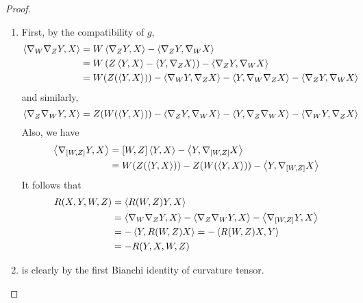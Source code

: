 \begin{enumerate}[label=\arabic{*}.]
\begin{proof}
\begin{enumerate}[label=(\arabic{*})]
			\item First, by the compatibility of $g$,
			\begin{equation*}
				\begin{aligned}
					\left\langle \nabla_W\nabla_ZY,X \right\rangle &= W \left\langle \nabla_ZY,X \right\rangle - \left\langle \nabla_ZY,\nabla_W X \right\rangle\\
					&= W \left(Z\left\langle Y,X \right\rangle - \left\langle Y,\nabla_ZX \right\rangle\right)- \left\langle \nabla_ZY,\nabla_W X \right\rangle\\
					&=W(Z(\left\langle Y,X \right\rangle)) - \left\langle \nabla_WY,\nabla_ZX \right\rangle- \left\langle Y,\nabla_W\nabla_ZX \right\rangle- \left\langle \nabla_ZY,\nabla_W X \right\rangle
				\end{aligned}
			\end{equation*}
			and similarly,
			\begin{equation*}
				\left\langle \nabla_Z\nabla_WY,X \right\rangle = Z(W(\left\langle Y,X \right\rangle)) - \left\langle \nabla_ZY,\nabla_WX \right\rangle- \left\langle Y,\nabla_Z\nabla_WX \right\rangle- \left\langle \nabla_WY,\nabla_Z X \right\rangle
			\end{equation*}
			Also, we have
			\begin{equation*}
				\begin{aligned}
					\left\langle \nabla_{[W,Z]}Y,X \right\rangle&= [W,Z]\left\langle Y,X \right\rangle - \left\langle Y,\nabla_{[W,Z]}X \right\rangle \\
					&=W(Z(\left\langle Y,X \right\rangle)) - Z(W(\left\langle Y,X \right\rangle))- \left\langle Y,\nabla_{[W,Z]}X \right\rangle
				\end{aligned}
			\end{equation*}
			It follows that
			\begin{equation*}
				\begin{aligned}
					R(X,Y,W,Z) &= \left\langle R(W,Z)Y,X \right\rangle \\
					&= \left\langle \nabla_W\nabla_ZY,X \right\rangle - \left\langle \nabla_Z\nabla_WY,X \right\rangle - \left\langle \nabla_{[W,Z]}Y,X \right\rangle \\
					&= -\left\langle Y,R(W,Z)X \right\rangle = -\left\langle R(W,Z)X,Y \right\rangle\\
					&=-R(Y,X,W,Z)
				\end{aligned}
			\end{equation*}

			\item is clearly by the first Bianchi identity of curvature tensor.


\end{enumerate}
\end{proof}
\end{enumerate}
